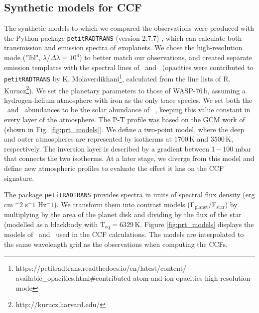 \documentclass{aa}
\newcommand{\feI}{\ion{Fe}{i}}
\newcommand{\feII}{\ion{Fe}{ii}}
\newcommand{\planet}{WASP-76\,b}
\begin{document}
\subsection{Synthetic models for CCF}
\label{synthetic_models}


The synthetic models to which we compared the observations were produced with the Python package \texttt{petitRADTRANS} (version 2.7.7) \citep{molliere2019, molliere2020, alei2022}, which can calculate both transmission and emission spectra of exoplanets. We chose the high-resolution mode ("lbl", $\lambda/\Delta\lambda=10^6$) to better match our observations, and created separate emission templates with the spectral lines of \feI\ and \feII\ (opacities were contributed to \texttt{petitRADTRANS} by K. Molaverdikhani\footnote{https://petitradtrans.readthedocs.io/en/latest/content/\\available\_opacities.html\#contributed-atom-and-ion-opacities-high-resolution-mode}, calculated from the line lists of R. Kurucz\footnote{http://kurucz.harvard.edu/}). We set the planetary parameters to those of \planet, assuming a hydrogen-helium atmosphere with iron as the only trace species. We set both the \feI\ and \feII\ abundances to be the solar abundance of \feI\ \citep{lodders2020}, keeping this value constant in every layer of the atmosphere. The P-T profile was based on the GCM work of \citet{wardenier2021, wardenier2023} (shown in Fig. \ref{fig:prt_models}). We define a two-point model, where the deep and outer atmospheres are represented by isotherms at 1700\,K and 3500\,K, respectively. The inversion layer is described by a gradient between 1\,$-$\,100 mbar that connects the two isotherms. At a later stage, we diverge from this model and define new atmospheric profiles to evaluate the effect it has on the CCF signature.

The package \texttt{petitRADTRANS} provides spectra in units of spectral flux density (erg cm $^-2$ s$^-1$ Hz$^-1$). We transform them into contrast models (F$_\mathrm{planet}$/F$_\mathrm{star}$) by multiplying by the area of the planet disk and dividing by the flux of the star (modelled as a blackbody with T$_\mathrm{eq} = 6329\,$K. Figure \ref{fig:prt_models} displays the models of \feI\ and \feII\ used in the CCF calculations. The models are interpolated to the same wavelength grid as the observations when computing the CCFs.


\end{document}
